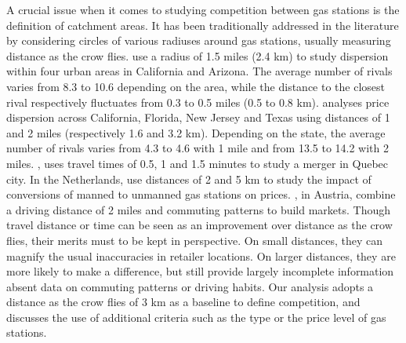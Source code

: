 \documentclass[english]{article}
\begin{document}
A crucial issue when it comes to studying competition between gas stations is the definition of catchment areas. It has been traditionally addressed in the literature by considering circles of various radiuses around gas stations, usually measuring distance as the crow flies. \cite{BAR04} use a radius of 1.5 miles (2.4 km) to study dispersion within four urban areas in California and Arizona. The average number of rivals varies from 8.3 to 10.6 depending on the area, while the distance to the closest rival respectively fluctuates from 0.3 to 0.5 miles (0.5 to 0.8 km). \cite{TAP11} analyses price dispersion across California, Florida, New Jersey and Texas using distances of 1 and 2 miles (respectively 1.6 and 3.2 km). Depending on the state, the average number of rivals varies from 4.3 to 4.6 with 1 mile and from 13.5 to 14.2 with 2 miles. \cite{HOU12}, uses travel times of 0.5, 1 and 1.5 minutes to study a merger in Quebec city. In the Netherlands, \cite{BRU15} use distances of 2 and 5 km to study the impact of conversions of manned to unmanned gas stations on prices. \cite{PEN15}, in Austria, combine a driving distance of 2 miles and commuting patterns to build markets.
Though travel distance or time can be seen as an improvement over distance as the crow flies, their merits must to be kept in perspective. On small distances, they can magnify the usual inaccuracies in retailer locations. On larger distances, they are more likely to make a difference, but still provide largely incomplete information absent data on commuting patterns or driving habits. Our analysis adopts a distance as the crow flies of 3 km as a baseline to define competition, and discusses the use of additional criteria such as the type or the price level of gas stations.
\end{document}
